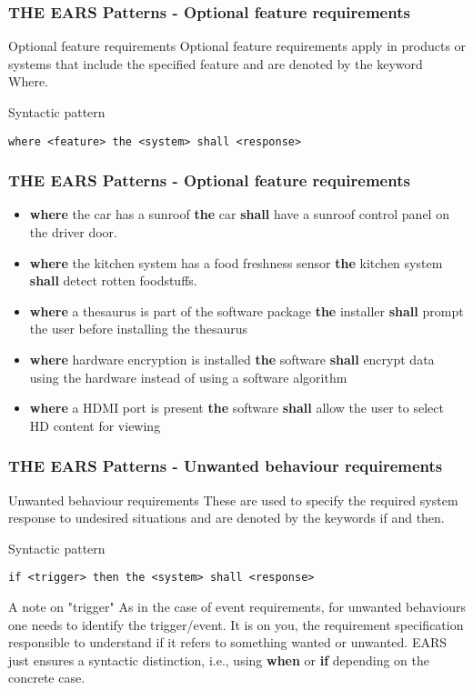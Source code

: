 \documentclass[aspectratio=169]{beamer}
\newcommand{\earso}[3]{{\bf \color{mygreen}where} {#1} {\bf \color{mypurple}the} {#2} {\bf \color{mypurple}shall} {#3}}
\begin{document}
%
\begin{frame}[fragile]
  \frametitle{THE EARS Patterns - Optional feature requirements}
  \begin{block}{Optional feature requirements}
   Optional feature requirements apply in products or systems that include the specified feature and are denoted by the keyword Where.
  \end{block}
  \begin{block}{Syntactic pattern}
  \begin{lstlisting}[language=EARS]
             where <feature> the <system> shall <response>
     \end{lstlisting}
   \end{block}
\end{frame}
%
\begin{frame}[fragile]
 \frametitle{THE EARS Patterns - Optional feature requirements}
 \begin{example}
  \begin{itemize}
   \item \earso{the car has a sunroof}{car}{have a sunroof control panel on the driver door}.
   \item \earso{the kitchen system has a food freshness sensor}{kitchen system}{detect rotten foodstuffs}. 
   \item \earso{a thesaurus is part of the software package}{installer}{prompt the user before installing the thesaurus}
   \item \earso{hardware encryption is installed}{software}{encrypt data using the hardware instead of using a software algorithm}
   \item \earso{a HDMI port is present}{software}{allow the user to select HD content for viewing}
  \end{itemize}
 \end{example}
\end{frame}
%
\begin{frame}[fragile]
 \frametitle{THE EARS Patterns - Unwanted behaviour requirements}
  \begin{block}{Unwanted behaviour requirements}
  These are used to specify the required system response to undesired situations and are denoted by the keywords if and then.
  \end{block}
  \begin{block}{Syntactic pattern}
   \begin{lstlisting}[language=EARS]
        if <trigger> then the <system> shall <response> 
   \end{lstlisting}
  \end{block}
  \begin{block}{A note on "trigger"}
    As in the case of event requirements, for unwanted behaviours one needs to identify the trigger/event. It is on you, the requirement specification responsible to understand if it refers to something wanted or unwanted. EARS just ensures a syntactic distinction, i.e., using {{\bf \color{mypurple} when}} or {{\bf \color{mygreen} if}} depending on the concrete case.
  \end{block}
\end{frame}  
\end{document}
